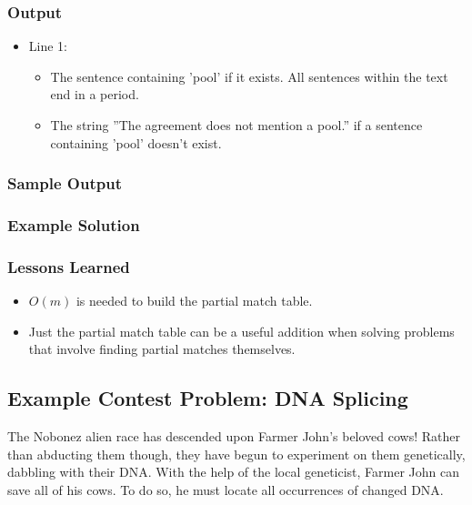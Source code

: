 \subsubsection{Output}
\begin{itemize}
	\item Line 1:
	\begin{itemize}
		\item The sentence containing 'pool' if it exists. All sentences within the text end in a period.
		\item The string ''The agreement does not mention a pool.'' if a sentence containing 'pool' doesn't exist.
	\end{itemize}
\end{itemize}

\subsubsection{Sample Output}

\subsubsection{Example Solution}

\subsubsection{Lessons Learned}
\begin{itemize}
	\item $O(m)$ is needed to build the partial match table.
	\item Just the partial match table can be a useful addition when solving problems that involve finding partial matches themselves.
\end{itemize}

\subsection{Example Contest Problem: DNA Splicing}
The Nobonez alien race has descended upon Farmer John's beloved cows!
Rather than abducting them though, they have begun to experiment on them genetically, dabbling with their DNA.
With the help of the local geneticist, Farmer John can save all of his cows.
To do so, he must locate all occurrences of changed DNA.

